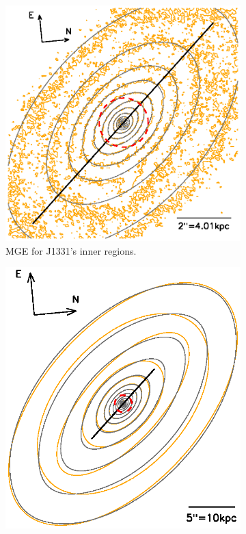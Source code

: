 \documentclass[useAMS,usenatbib]{mnras}
\begin{document}
\begin{figure}
\centering
\begin{subfigure}{.5\textwidth}
  \centering
  \includegraphics[width=.8\columnwidth]{1331F814Wsci_MGE_M.ps}
  \caption{MGE for J1331's inner regions.}
 \label{fig:MGEinnerRegions}
\end{subfigure}%
\begin{subfigure}{.5\textwidth}
  \centering
  \includegraphics[width=.8\columnwidth]{1331F814W_MGE_disk_L.ps}

\end{subfigure}
\end{figure}
\end{document}

